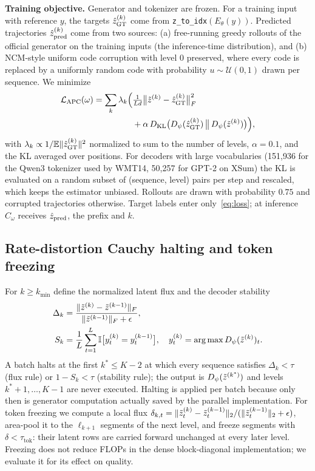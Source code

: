 \textbf{Training objective.} Generator and tokenizer are frozen. For a training input with reference $y$, the targets $\hat{z}^{(k)}_{\mathrm{GT}}$ come from \texttt{z\_to\_idx}$(E_\theta(y))$. Predicted trajectories $\hat{z}^{(k)}_{\mathrm{pred}}$ come from two sources: (a) free-running greedy rollouts of the official generator on the training inputs (the inference-time distribution), and (b) NCM-style uniform code corruption with level 0 preserved, where every code is replaced by a uniformly random code with probability $u\sim\mathcal{U}(0,1)$ drawn per sequence. We minimize
\begin{align}
\mathcal{L}_{\mathrm{APC}}(\omega)=\sum_{k}\lambda_k\Big(&\tfrac{1}{Ld}\big\|\tilde{z}^{(k)}-\hat{z}^{(k)}_{\mathrm{GT}}\big\|_F^2\nonumber\\
&+\alpha\,D_{\mathrm{KL}}\big(D_\psi(\hat{z}^{(k)}_{\mathrm{GT}})\,\big\|\,D_\psi(\tilde{z}^{(k)})\big)\Big), \label{eq:loss}
\end{align}
with $\lambda_k\propto 1/\mathbb{E}\|\hat{z}^{(k)}_{\mathrm{GT}}\|^2$ normalized to sum to the number of levels, $\alpha=0.1$, and the KL averaged over positions. For decoders with large vocabularies (151{,}936 for the Qwen3 tokenizer used by WMT14, 50{,}257 for GPT-2 on XSum) the KL is evaluated on a random subset of (sequence, level) pairs per step and rescaled, which keeps the estimator unbiased. Rollouts are drawn with probability $0.75$ and corrupted trajectories otherwise. Target labels enter only~\eqref{eq:loss}; at inference $C_\omega$ receives $\hat{z}_{\mathrm{pred}}$, the prefix and $k$.

\subsection{Rate-distortion Cauchy halting and token freezing}
For $k\ge k_{\min}$ define the normalized latent flux and the decoder stability
\begin{align}
\Delta_k&=\frac{\|\tilde{z}^{(k)}-\tilde{z}^{(k-1)}\|_F}{\|\tilde{z}^{(k-1)}\|_F+\epsilon},\label{eq:flux}\\
S_k&=\frac{1}{L}\sum_{t=1}^{L}\mathbb{I}\big[y^{(k)}_t=y^{(k-1)}_t\big],\quad y^{(k)}_t=\operatorname*{arg\,max} D_\psi(\tilde{z}^{(k)})_t.\label{eq:stab}
\end{align}
A batch halts at the first $k^\ast\le K-2$ at which every sequence satisfies $\Delta_{k}<\tau$ (flux rule) or $1-S_k<\tau$ (stability rule); the output is $D_\psi(\tilde{z}^{(k^\ast)})$ and levels $k^\ast+1,\dots,K-1$ are never executed. Halting is applied per batch because only then is generator computation actually saved by the parallel implementation. For token freezing we compute a local flux $\delta_{k,t}=\|\tilde{z}^{(k)}_t-\tilde{z}^{(k-1)}_t\|_2/(\|\tilde{z}^{(k-1)}_t\|_2+\epsilon)$, area-pool it to the $\ell_{k+1}$ segments of the next level, and freeze segments with $\delta<\tau_{\mathrm{tok}}$: their latent rows are carried forward unchanged at every later level. Freezing does not reduce FLOPs in the dense block-diagonal implementation; we evaluate it for its effect on quality.

